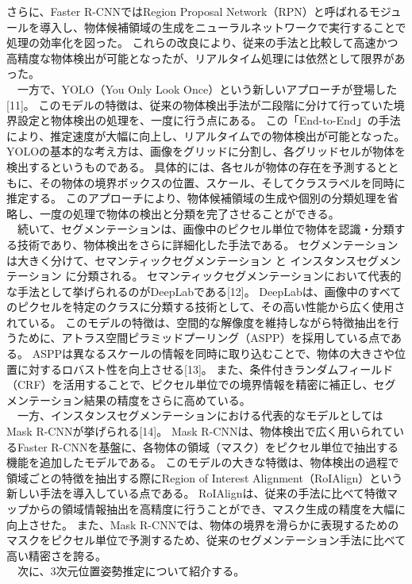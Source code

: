 さらに、Faster R-CNNではRegion Proposal Network（RPN）と呼ばれるモジュールを導入し、物体候補領域の生成をニューラルネットワークで実行することで処理の効率化を図った。
これらの改良により、従来の手法と比較して高速かつ高精度な物体検出が可能となったが、リアルタイム処理には依然として限界があった。\\
　一方で、YOLO（You Only Look Once）という新しいアプローチが登場した[11]。
このモデルの特徴は、従来の物体検出手法が二段階に分けて行っていた境界設定と物体検出の処理を、一度に行う点にある。
この「End-to-End」の手法により、推定速度が大幅に向上し、リアルタイムでの物体検出が可能となった。
YOLOの基本的な考え方は、画像をグリッドに分割し、各グリッドセルが物体を検出するというものである。
具体的には、各セルが物体の存在を予測するとともに、その物体の境界ボックスの位置、スケール、そしてクラスラベルを同時に推定する。
このアプローチにより、物体候補領域の生成や個別の分類処理を省略し、一度の処理で物体の検出と分類を完了させることができる。\\
　続いて、セグメンテーションは、画像中のピクセル単位で物体を認識・分類する技術であり、物体検出をさらに詳細化した手法である。
セグメンテーションは大きく分けて、セマンティックセグメンテーション と インスタンスセグメンテーション に分類される。
セマンティックセグメンテーションにおいて代表的な手法として挙げられるのがDeepLabである[12]。
DeepLabは、画像中のすべてのピクセルを特定のクラスに分類する技術として、その高い性能から広く使用されている。
このモデルの特徴は、空間的な解像度を維持しながら特徴抽出を行うために、アトラス空間ピラミッドプーリング（ASPP）を採用している点である。
ASPPは異なるスケールの情報を同時に取り込むことで、物体の大きさや位置に対するロバスト性を向上させる[13]。
また、条件付きランダムフィールド（CRF）を活用することで、ピクセル単位での境界情報を精密に補正し、セグメンテーション結果の精度をさらに高めている。\\
　一方、インスタンスセグメンテーションにおける代表的なモデルとしてはMask R-CNNが挙げられる[14]。
Mask R-CNNは、物体検出で広く用いられているFaster R-CNNを基盤に、各物体の領域（マスク）をピクセル単位で抽出する機能を追加したモデルである。
このモデルの大きな特徴は、物体検出の過程で領域ごとの特徴を抽出する際にRegion of Interest Alignment（RoIAlign）という新しい手法を導入している点である。
RoIAlignは、従来の手法に比べて特徴マップからの領域情報抽出を高精度に行うことができ、マスク生成の精度を大幅に向上させた。
また、Mask R-CNNでは、物体の境界を滑らかに表現するためのマスクをピクセル単位で予測するため、従来のセグメンテーション手法に比べて高い精密さを誇る。\\
　次に、3次元位置姿勢推定について紹介する。

